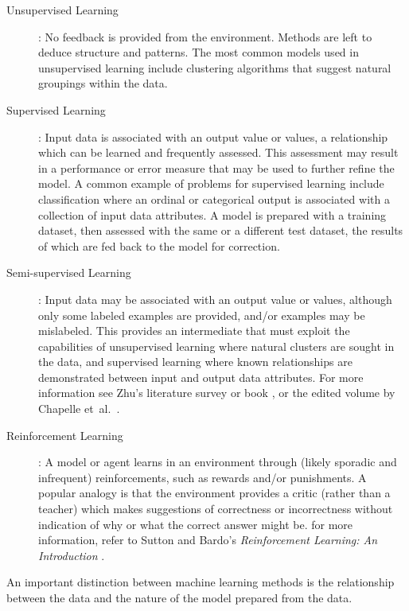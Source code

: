 \documentclass[a4paper, 11pt]{article}
\begin{document}
\begin{description}
	\item[Unsupervised Learning]: No feedback is provided from the environment. Methods are left to deduce structure and patterns. The most common models used in unsupervised learning include clustering algorithms that suggest natural groupings within the data.
	
	\item[Supervised Learning]: Input data is associated with an output value or values, a relationship which can be learned and frequently assessed. This assessment may result in a performance or error measure that may be used to further refine the model. A common example of problems for supervised learning include classification where an ordinal or categorical output is associated with a collection of input data attributes. A model is prepared with a training dataset, then assessed with the same or a different test dataset, the results of which are fed back to the model for correction.
	
	\item[Semi-supervised Learning]: Input data may be associated with an output value or values, although only some labeled examples are provided, and/or examples may be mislabeled. This provides an intermediate that must exploit the capabilities of unsupervised learning where natural clusters are sought in the data, and supervised learning where known relationships are demonstrated between input and output data attributes. For more information see Zhu's literature survey \cite{Zhu2008} or book \cite{Zhu2009}, or the edited volume by Chapelle et~al.\ \cite{Chapelle2010}.
	
	\item[Reinforcement Learning]: A model or agent learns in an environment through (likely sporadic and infrequent) reinforcements, such as rewards and/or punishments. A popular analogy is that the environment provides a critic (rather than a teacher) which makes suggestions of correctness or incorrectness without indication of why or what the correct answer might be. for more information, refer to Sutton and Bardo's \emph{Reinforcement Learning: An Introduction} \cite{Sutton1998}.
\end{description}

An important distinction between machine learning methods is the relationship between the data and the nature of the model prepared from the data.
\end{document}
